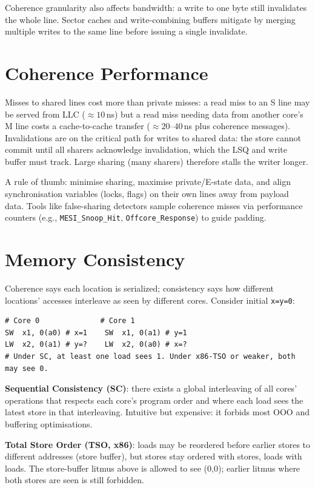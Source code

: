 Coherence granularity also affects bandwidth: a write to one byte still invalidates the whole line. Sector caches and write-combining buffers mitigate by merging multiple writes to the same line before issuing a single invalidate.

\section{Coherence Performance}
Misses to shared lines cost more than private misses: a read miss to an S line may be served from LLC ($\approx 10$\,ns) but a read miss needing data from another core's M line costs a cache-to-cache transfer ($\approx 20$--$40$\,ns plus coherence messages). Invalidations are on the critical path for writes to shared data: the store cannot commit until all sharers acknowledge invalidation, which the LSQ and write buffer must track. Large sharing (many sharers) therefore stalls the writer longer.

A rule of thumb: minimise sharing, maximise private/E-state data, and align synchronisation variables (locks, flags) on their own lines away from payload data. Tools like false-sharing detectors sample coherence misses via performance counters (e.g., \texttt{MESI\_Snoop\_Hit}, \texttt{Offcore\_Response}) to guide padding.

\section{Memory Consistency}
Coherence says each location is serialized; consistency says how different locations' accesses interleave as seen by different cores. Consider initial \texttt{x=y=0}:

\begin{lstlisting}[language={[x86masm]Assembler}, caption={Classic litmus test (store buffering)}, label={lst:litmus1}]
# Core 0              # Core 1
SW  x1, 0(a0) # x=1    SW  x1, 0(a1) # y=1
LW  x2, 0(a1) # y=?    LW  x2, 0(a0) # x=?
# Under SC, at least one load sees 1. Under x86-TSO or weaker, both may see 0.
\end{lstlisting}

\textbf{Sequential Consistency (SC)}: there exists a global interleaving of all cores' operations that respects each core's program order and where each load sees the latest store in that interleaving. Intuitive but expensive: it forbids most OOO and buffering optimisations.

\textbf{Total Store Order (TSO, x86)}: loads may be reordered before earlier stores to different addresses (store buffer), but stores stay ordered with stores, loads with loads. The store-buffer litmus above is allowed to see (0,0); earlier litmus where both stores are seen is still forbidden.

